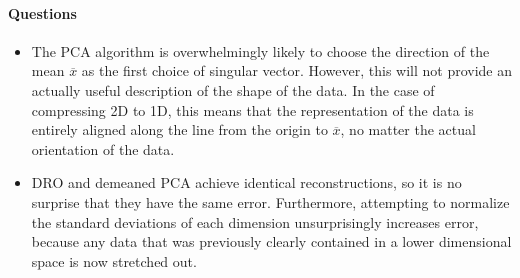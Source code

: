 \documentclass[a4paper]{article}
\newcounter{thm}
\theoremstyle{definition}
\newenvironment{soln}{
    \leavevmode\color{blue}\ignorespaces
}{}
\begin{document}
\begin{soln}
\paragraph{Questions}

\begin{itemize}
  \item The PCA algorithm is overwhelmingly likely to choose the direction of the mean $\overline{x}$ as the first choice of singular vector. However, this will not provide an actually useful description of the shape of the data. In the case of compressing 2D to 1D, this means that the representation of the data is entirely aligned along the line from the origin to $\overline{x}$, no matter the actual orientation of the data.

  \item DRO and demeaned PCA achieve identical reconstructions, so it is no surprise that they have the same error. Furthermore, attempting to normalize the standard deviations of each dimension unsurprisingly increases error, because any data that was previously clearly contained in a lower dimensional space is now stretched out.
\end{itemize}

\end{soln}


\end{document}
